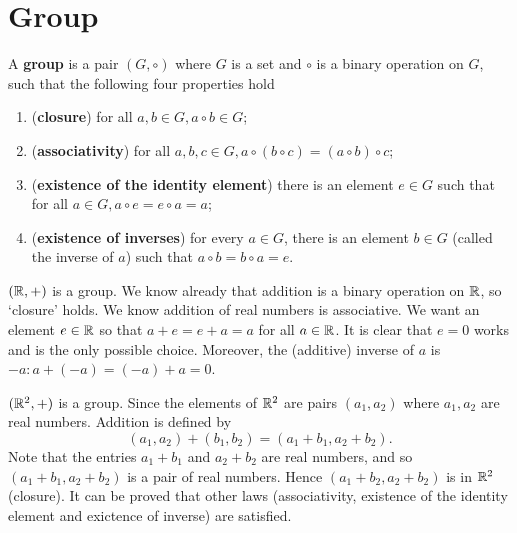 \documentclass[12pt]{book}
\begin{document}
\section{Group}
\label{sec:Group}

\begin{defi}\label{def:group1}
      A \textbf{group} is a pair $(G,\circ)$ where $G$ is a set and $\circ$ is a binary operation on $G$, such that the following four properties hold
	  \begin{enumerate}
	        \item (\textbf{closure}) for all $a, b \in G, a \circ b \in G$;
			\item (\textbf{associativity}) for all $a, b, c \in G, a \circ (b \circ c) = (a \circ b) \circ c$;
			\item (\textbf{existence of the identity element}) there is an element $e \in G$ such that for all $a \in G, a \circ e = e \circ a = a$;
			\item (\textbf{existence of inverses}) for every $a \in G$, there is an element $b \in G$ (called the inverse of $a$) such that
            $a \circ b = b \circ a = e$.
	  \end{enumerate}
\end{defi}

\begin{examp}\label{exp:group1}
      $(\mathbb{R},+)$ is a group. We know already that addition is a binary operation on $\mathbb{R}$, so ‘closure’ holds. We know addition of real numbers
       is associative. We want an element $e \in \mathbb{R}$ so that $a + e = e + a = a$ for all $a \in \mathbb{R}$. It is clear that $e = 0$ works and 
	   is the only possible choice. Moreover, the (additive) inverse of $a$ is $-a : a +(-a) = (-a) + a = 0$.
\end{examp}

\begin{examp}\label{exp:group2}
      $(\mathbb{R}^2,+)$ is a group. Since the  elements of $\mathbb{R}^2$ are pairs $(a_1,a_2)$ where $a_1, a_2$ are real numbers. Addition is defined
      by 
      $$(a_1,a_2)+(b_1,b_2) = (a_1+b_1,a_2+b_2).$$
      Note that the entries $a_1 + b_1$ and $a_2 + b_2$ are real numbers, and so $(a_1 + b_1,a_2 +b_2)$ is a pair of real numbers. Hence 
	  $(a_1 + b_2,a_2 + b_2)$ is in $\mathbb{R}^2$ (closure). It can be proved that other laws (associativity, existence of the identity element 
	  and exictence of inverse) are satisfied.
\end{examp}
\end{document}
